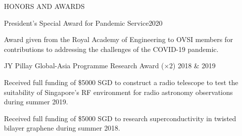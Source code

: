 \documentclass{resume} %
\newcommand{\tab}[1]{\hspace{.2667\textwidth}\rlap{#1}}
\newcommand{\itab}[1]{\hspace{0em}\rlap{#1}}
\begin{document}
\begin{rSection}{HONORS AND AWARDS}

\begin{rSubsection}
{President's Special Award for Pandemic Service}{2020}{}{}
\item Award given from the Royal Academy of Engineering to OVSI members for contributions to addressing the challenges of the COVID-19 pandemic. 
\end{rSubsection}

\newpage

\begin{rSubsection}
{JY Pillay Global-Asia Programme Research Award ($\times 2$) }{2018 \& 2019}{}{}
\item Received full funding of \$5000 SGD  to construct a radio telescope to test the suitability of  Singapore's RF environment for radio astronomy observations during summer 2019.
    \item Received full funding of \$5000 SGD to research superconductivity in twisted bilayer graphene during summer 2018.
\end{rSubsection}


\end{rSection}
\end{document}
